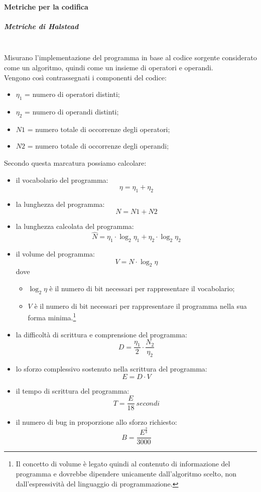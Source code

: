 \paragraph{Metriche per la codifica}\mbox{}
\subparagraph{Metriche di Halstead}\mbox{}\\
Misurano l'implementazione del programma in base al codice sorgente considerato come un algoritmo, quindi come un insieme di operatori e operandi.\\
Vengono così contrassegnati i componenti del codice:
\begin{itemize}
	\item $\eta_{1}$ = numero di operatori distinti;
	\item $\eta_{2}$ = numero di operandi distinti;
	\item $N1$ = numero totale di occorrenze degli operatori; 
	\item $N2$ = numero totale di occorrenze degli operandi;
\end{itemize}
Secondo questa marcatura possiamo calcolare:
\begin{itemize}
	\item il vocabolario del programma:
		\[ \eta = \eta_{1} + \eta_{2} \]
	\item la lunghezza del programma:
		\[ N = N1 + N2 \]
	\item la lunghezza calcolata del programma: 
		\[ {\hat {N}}=\eta_{1} \cdot \log_{2}\eta_{1}+\eta_{2} \cdot \log_{2}\eta_{2} \]
	\item il volume del programma:
		\[ V = N \cdot \log_{2}\eta \] 
		dove
		\begin{itemize}
			\item $ \log_{2}\eta $ è il numero di bit necessari per rappresentare il vocabolario;
			\item $ V $ è il numero di bit necessari per rappresentare il programma nella sua forma minima.\footnote{Il concetto di volume è legato quindi al contenuto di informazione del programma e dovrebbe dipendere unicamente dall'algoritmo scelto, non dall'espressività del linguaggio di programmazione.}
		\end{itemize}
	\item la difficoltà di scrittura e comprensione del programma:
		\[ D = \frac{\eta_{1}}{2} \cdot \frac{N_{2}}{\eta_{2}} \]
	\item lo sforzo complessivo sostenuto nella scrittura del programma:
		\[ E = D \cdot V \]
	\item il tempo di scrittura del programma:
		\[ T=\frac{E}{18}\ secondi\]
	\item il numero di bug in proporzione allo sforzo richiesto:
		\[ B = \frac{E^{\frac{2}{3}}}{3000} \]	
\end{itemize}

